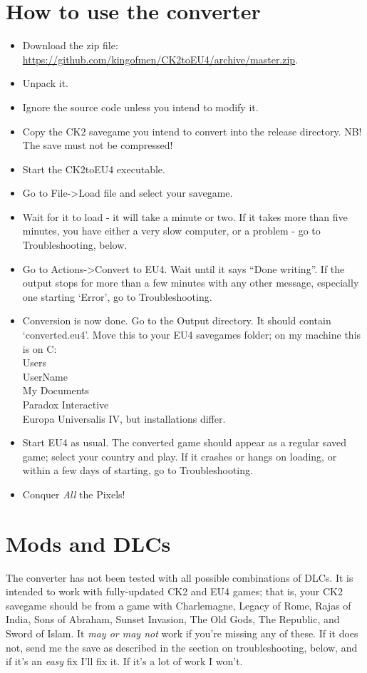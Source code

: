 \documentclass[12pt,ebook,oneside]{book}
\begin{document}
\section{How to use the converter}

\begin{itemize}
\item Download the zip file: \url{https://github.com/kingofmen/CK2toEU4/archive/master.zip}.
\item Unpack it. 
\item Ignore the source code unless you intend to modify it. 
\item Copy the CK2 savegame you intend to convert into the release
  directory. NB! The save must not be compressed!
\item Start the CK2toEU4 executable. 
\item Go to File->Load file and select your savegame. 
\item Wait for it to load - it will take a minute or two. If it takes
  more than five minutes, you have either a very slow computer, or a
  problem - go to Troubleshooting, below. 
\item Go to Actions->Convert to EU4. Wait until it says ``Done
  writing''. If the output stops for more than a few minutes with any
  other message, especially one starting `Error', go to
  Troubleshooting. 
\item Conversion is now done. Go to the Output directory. It should
  contain `converted.eu4'. Move this to your EU4 savegames folder; on
  my machine this is on C:\\Users\\UserName\\My Documents\\Paradox
  Interactive\\Europa Universalis IV, but installations differ. 
\item Start EU4 as usual. The converted game should appear as a
  regular saved game; select your country and play. If it crashes or
  hangs on loading, or within a few days of starting, go to
  Troubleshooting. 
\item Conquer \emph{All} the Pixels! 
\end{itemize}

\section{Mods and DLCs}

The converter has not been tested with all possible combinations of
DLCs. It is intended to work with fully-updated CK2 and EU4 games;
that is, your CK2 savegame should be from a game with Charlemagne,
Legacy of Rome, Rajas of India, Sons of Abraham, Sunset Invasion, The
Old Gods, The Republic, and Sword of Islam. It \emph{may or may not}
work if you're missing any of these. If it does not, send me the save
as described in the section on troubleshooting, below, and if it's an
\emph{easy} fix I'll fix it. If it's a lot of work I won't.
\end{document}
